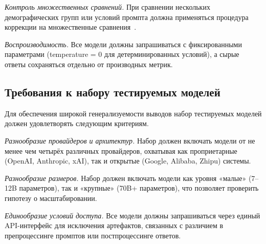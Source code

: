 \textit{Контроль множественных сравнений.} При сравнении нескольких демографических групп или условий промпта должна применяться процедура коррекции на множественные сравнения~\cite{benjamini1995controlling}.

\textit{Воспроизводимость.} Все модели должны запрашиваться с фиксированными параметрами (temperature = 0 для детерминированных условий), а сырые ответы сохраняться отдельно от производных метрик.

\subsection{Требования к набору тестируемых моделей}

Для обеспечения широкой генерализуемости выводов набор тестируемых моделей должен удовлетворять следующим критериям.

\textit{Разнообразие провайдеров и архитектур.} Набор должен включать модели от не менее чем четырёх различных провайдеров, охватывая как проприетарные (OpenAI, Anthropic, xAI), так и открытые (Google, Alibaba, Zhipu) системы.

\textit{Разнообразие размеров.} Набор должен включать модели как уровня «малые» (7--12B параметров), так и «крупные» (70B+ параметров), что позволяет проверить гипотезу о масштабировании.

\textit{Единообразие условий доступа.} Все модели должны запрашиваться через единый API-интерфейс для исключения артефактов, связанных с различием в препроцессинге промптов или постпроцессинге ответов.